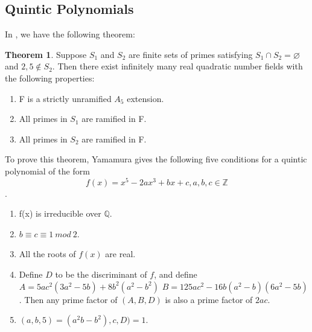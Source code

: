 \documentclass[12pt]{extarticle}
\newcommand{\Q}{\mathbb{Q}}
\newcommand{\<}{\langle}
\renewcommand{\>}{\rangle}
\renewcommand{\emptyset}{\varnothing}
\theoremstyle{definition}
\newtheorem{theorem}{Theorem}
\begin{document}
\subsection{Quintic Polynomials}
In \cite{YAMAMURA2}, we have the following theorem:
\begin{theorem}
    Suppose $S_1$ and $S_2$ are finite sets of primes satisfying $S_1 \cap S_2 = \emptyset$ and $2,5 \notin S_2$. Then there exist infinitely many real quadratic number fields with the following properties: \begin{enumerate}
        \item F is a strictly unramified $A_5$ extension.
        \item All primes in $S_1$ are ramified in F.
        \item All primes in $S_2$ are ramified in F.
    \end{enumerate}
\end{theorem}
To prove this theorem, Yamamura gives the following five conditions for a quintic polynomial of the form \begin{equation}
    f(x)=x^5-2ax^3+bx+c, a,b,c \in \mathbb{Z}
\end{equation}.
\begin{enumerate}
\item f(x) is irreducible over $\Q$.
\item $b \equiv c \equiv 1 \: mod \: 2  $.
\item All the roots of $f(x)$ are real.
\item Define $D$ to be the discriminant of $f$, and define
$A= 5ac^2(3a^2-5b)+8b^2(a^2-b^2)$
$B = 125ac^2-16b(a^2-b)(6a^2-5b)$.
Then any prime factor of $(A,B,D)$ is also a prime factor of $2ac$. 

\item $(a,b,5) =(a^2b-b^2),c,D)=1$.

\end{enumerate} 
\end{document}
